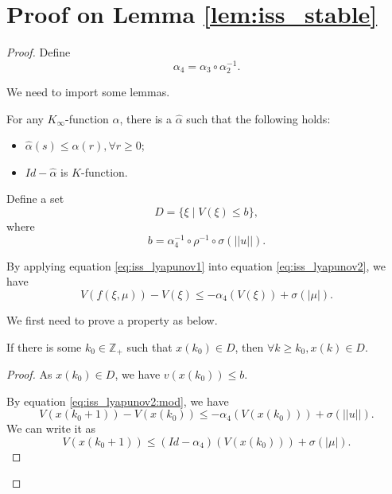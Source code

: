 \section{Proof on Lemma \ref{lem:iss_stable}}
\label{sec:app:proof_lemma}

\begin{proof}

Define
\begin{equation}
\label{eq:def_alpha4}
\alpha_{4} = \alpha_{3} \circ \alpha_{2}^{-1}.
\end{equation}

We need to import some lemmas.

\begin{mylem}
\label{lem:k_func_prop1}
For any $ K_{\infty} $-function $ \alpha $, there is a $ \hat{ \alpha } $ such that the following holds:
\begin{itemize}
\item $ \hat{\alpha} (s) \leq \alpha (r), \forall r \geq 0 $; 
\item $ Id - \hat{\alpha} $ is $ K $-function.
\end{itemize}
\end{mylem}

Define a set 
\begin{equation}
\label{eq:def_set_D}
D = \{ \xi \mid V( \xi ) \leq b \},
\end{equation}
where 
\begin{equation}
b = \alpha_{4}^{-1} \circ \rho^{-1} \circ \sigma ( || u || ).  
\end{equation}

By applying equation \eqref{eq:iss_lyapunov1} into equation \eqref{eq:iss_lyapunov2}, we have
\begin{equation}
\label{eq:iss_lyapunov2:mod}
V( f( \xi, \mu ) ) - V( \xi ) \leq - \alpha_{4} ( V( \xi ) ) + \sigma ( | \mu | ).
\end{equation}

We first need to prove a property as below.
\begin{myprop}
\label{prop:after_j0}
If there is some $ k_{0} \in \mathbb{Z}_{+} $ such that $ x( k_{0} ) \in D $, then $ \forall k \geq k_{0} , x(k) \in D $.
\begin{proof}
As $ x( k_{0} ) \in D $, we have $ v( x( k_{0} ) ) \leq b $.

By equation \eqref{eq:iss_lyapunov2:mod}, we have
\begin{equation}
V( x(k_{0} + 1) ) - V( x( k_{0} ) ) \leq - \alpha_{4} ( V ( x( k_{0} ) ) ) + \sigma ( || u || ).
\end{equation}
We can write it as 
\begin{equation}
V( x(k_{0} + 1) ) \leq ( Id - \alpha_{4} ) ( V ( x( k_{0} ) ) ) + \sigma ( | \mu | ).
\end{equation}


\end{proof}
\end{myprop}
\end{proof}
